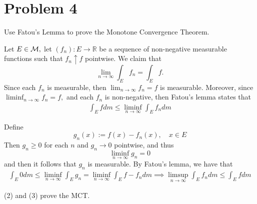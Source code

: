 \documentclass[11pt]{article}
\newcommand{\bbR}{\mathbb{R}}
\begin{document}
\newpage
\section*{Problem 4}
\begin{problem}
    Use Fatou's Lemma to prove the Monotone Convergence Theorem.
\end{problem}
\begin{solution}
    Let $E\in \cal M,$ let $(f_n): E\to \bbR$ be a sequence of non-negative measurable functions such that $f_n \uparrow f$ pointwise. We claim that 
    \[\lim_{n\to \infty} \int_E f_n = \int_E f.\] 
    Since each $f_n$ is measurable, then $\displaystyle\lim_{n\to \infty}f_n = f$ is measurable. Moreover, since $\displaystyle\liminf_{n\to \infty}f_n = f,$ and each $f_n$ is non-negative, then Fatou's lemma states that 
    \begin{align}
    \int_E f dm \leq \liminf_{n\to \infty} \int_E f_n    dm
    \end{align}
    
    
    
    Define 
    \[g_n(x):= f(x)- f_n(x), \quad x\in E\] Then $g_n \geq 0$ for each $n$ and $g_n \to 0$ pointwise, and thus \[\liminf_{n\to \infty} g_n = 0\]  and then it follows that $g_n$ is measurable. By Fatou's lemma, we have that 
    \begin{align}
    \int_E 0dm \leq \liminf_{n\to \infty}\int_E g_n = \liminf_{n\to \infty}\int_E f - f_n dm \implies \limsup_{n\to \infty}\int_E f_n dm \leq \int_Ef dm    
    \end{align}

    (2) and (3) prove the MCT.    
\end{solution}


\newpage
\end{document}
